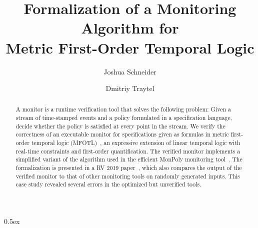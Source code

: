 \documentclass[10pt,a4paper]{article}
\begin{document}
\title{Formalization of a Monitoring Algorithm for\\ Metric First-Order Temporal Logic}
\author{Joshua Schneider \and Dmitriy Traytel}

\maketitle

\begin{abstract} A monitor is a runtime verification tool that solves the following
problem: Given a stream of time-stamped events and a policy formulated in a specification
language, decide whether the policy is satisfied at every point in the stream. We verify
the correctness of an executable monitor for specifications given as formulas in metric
first-order temporal logic (MFOTL)~\cite{BasinKMZ-JACM15}, an expressive extension of
linear temporal logic with real-time constraints and
first-order quantification. The verified monitor implements a simplified variant of the algorithm
used in the efficient MonPoly monitoring tool~\cite{monpoly}. The formalization is presented in a
RV 2019 paper~\cite{SchneiderBKT-RV19}, which also compares the output of the
verified monitor to that of other monitoring tools on randomly generated inputs. This
case study revealed several errors in the optimized but unverified tools. \end{abstract}

\tableofcontents

\parindent 0pt\parskip 0.5ex





\end{document}
